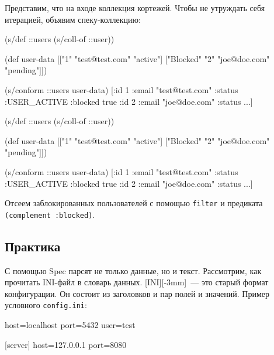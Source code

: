 Представим, что на входе коллекция кортежей. Чтобы не утруждать себя итерацией,
объявим спеку-коллекцию:

\ifx\devicetype\mobile

\begin{english}
  \begin{clojure}
(s/def ::users (s/coll-of ::user))

(def user-data
  [["1" "test@test.com" "active"]
   ["Blocked" "2" "joe@doe.com"
    "pending"]])

(s/conform ::users user-data)
[{:id 1
  :email "test@test.com"
  :status :USER_ACTIVE}
 {:blocked true
  :id 2
  :email "joe@doe.com"
  :status ...}]
  \end{clojure}
\end{english}

\else

\begin{english}
  \begin{clojure}
(s/def ::users (s/coll-of ::user))

(def user-data
  [["1" "test@test.com" "active"]
   ["Blocked" "2" "joe@doe.com" "pending"]])

(s/conform ::users user-data)
[{:id 1 :email "test@test.com" :status :USER_ACTIVE}
 {:blocked true :id 2 :email "joe@doe.com" :status ...}]
  \end{clojure}
\end{english}

\fi


Отсеем заблокированных пользователей с помощью \verb|filter| и предиката
\verb|(complement :blocked)|.

\subsection{Практика}


С помощью Spec парсят не только данные, но и текст. Рассмотрим, как прочитать
INI-файл в словарь данных. [INI][-3mm]~---
это старый формат конфигурации. Он состоит из заголовков и пар полей и
значений. Пример условного \verb|config.ini|:

\begin{english}
  \begin{ini}
[database]
host=localhost
port=5432
user=test

[server]
host=127.0.0.1
port=8080
  \end{ini}
\end{english}

